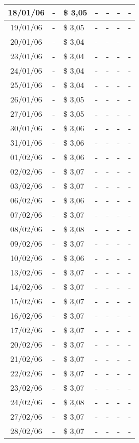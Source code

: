 \begin{center}
\begin{longtable}{|c|p{1.5cm}|p{1.5cm}|p{1.5cm}|p{1.5cm}|p{1.5cm}|p{1.5cm}|}
18/01/06 & - & \$ 3,05 & - & - & - & - \\ \hline
19/01/06 & - & \$ 3,05 & - & - & - & - \\ \hline
20/01/06 & - & \$ 3,04 & - & - & - & - \\ \hline
23/01/06 & - & \$ 3,04 & - & - & - & - \\ \hline
24/01/06 & - & \$ 3,04 & - & - & - & - \\ \hline
25/01/06 & - & \$ 3,04 & - & - & - & - \\ \hline
26/01/06 & - & \$ 3,05 & - & - & - & - \\ \hline
27/01/06 & - & \$ 3,05 & - & - & - & - \\ \hline
30/01/06 & - & \$ 3,06 & - & - & - & - \\ \hline
31/01/06 & - & \$ 3,06 & - & - & - & - \\ \hline
01/02/06 & - & \$ 3,06 & - & - & - & - \\ \hline
02/02/06 & - & \$ 3,07 & - & - & - & - \\ \hline
03/02/06 & - & \$ 3,07 & - & - & - & - \\ \hline
06/02/06 & - & \$ 3,06 & - & - & - & - \\ \hline
07/02/06 & - & \$ 3,07 & - & - & - & - \\ \hline
08/02/06 & - & \$ 3,08 & - & - & - & - \\ \hline
09/02/06 & - & \$ 3,07 & - & - & - & - \\ \hline
10/02/06 & - & \$ 3,06 & - & - & - & - \\ \hline
13/02/06 & - & \$ 3,07 & - & - & - & - \\ \hline
14/02/06 & - & \$ 3,07 & - & - & - & - \\ \hline
15/02/06 & - & \$ 3,07 & - & - & - & - \\ \hline
16/02/06 & - & \$ 3,07 & - & - & - & - \\ \hline
17/02/06 & - & \$ 3,07 & - & - & - & - \\ \hline
20/02/06 & - & \$ 3,07 & - & - & - & - \\ \hline
21/02/06 & - & \$ 3,07 & - & - & - & - \\ \hline
22/02/06 & - & \$ 3,07 & - & - & - & - \\ \hline
23/02/06 & - & \$ 3,07 & - & - & - & - \\ \hline
24/02/06 & - & \$ 3,08 & - & - & - & - \\ \hline
27/02/06 & - & \$ 3,07 & - & - & - & - \\ \hline
28/02/06 & - & \$ 3,07 & - & - & - & - \\ \hline

\end{longtable}
\end{center}
